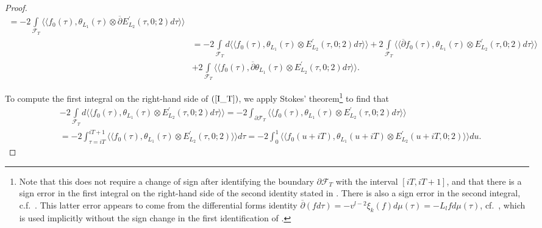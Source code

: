 \documentclass{amsart}
\theoremstyle{definition}
\begin{document}
\begin{proof}
\begin{equation}
\begin{aligned}
= -2 \int\limits_{\mathcal{F}_T} \langle \langle f_0(\tau), \theta_{L_1}(\tau) \otimes \overline{\partial} E_{L_2}^{\prime}(\tau, 0; 2) d \tau \rangle \rangle \\
&=  -2 \int\limits_{\mathcal{F}_T} d \langle \langle f_0(\tau), \theta_{L_1}(\tau) \otimes E_{L_2}^{\prime}(\tau, 0; 2) d \tau \rangle \rangle
+ 2 \int\limits_{\mathcal{F}_T} \langle \langle \overline{\partial} f_0(\tau), \theta_{L_1}(\tau) \otimes E_{L_2}^{\prime}(\tau, 0; 2) d \tau \rangle \rangle \\
&+ 2 \int\limits_{\mathcal{F}_T} \langle \langle  f_0(\tau),  \overline{\partial} \theta_{L_1}(\tau) \otimes E_{L_2}^{\prime}(\tau, 0; 2) d \tau \rangle \rangle. \end{aligned}\end{equation} 

To compute the first integral on the right-hand side of $(\ref{I_T})$, 
we apply Stokes' theorem\footnote{Note that this does not require a change
of sign after identifying the boundary $\partial \mathcal{F}_T$ with the interval $[iT, iT+1]$, 
and that there is a sign error in the first integral on the right-hand side of the second identity stated in \cite[p.~655, proof of Theorem 4.7]{BY}. 
There is also a sign error in the second integral, c.f.~\cite[Theorem 5.7.1]{AGHMP}.
This latter error appears to come from the differential forms identity 
$\overline{\partial}(f d \tau) = -v^{l-2} \xi_k(f) d \mu(\tau) = -L_l f d \mu(\tau)$, cf.~\cite[Lemma 2.5]{Eh},
which is used implicitly without the sign change in the first identification of \cite[p.~655]{BY}.} to find that 
\begin{equation}\begin{aligned}\label{I_T1} 
&-2 \int\limits_{\mathcal{F}_T} d \langle \langle f_0(\tau), \theta_{L_1}(\tau) \otimes E^{\prime}_{L_2}(\tau, 0; 2) d \tau \rangle \rangle 
= -2 \int_{\partial \mathcal{F}_T} \langle \langle f_0(\tau), \theta_{L_1}(\tau) \otimes E_{L_2}^{\prime}(\tau, 0; 2) d \tau \rangle \rangle \\
&= - 2 \int_{\tau = i T}^{iT +1} \langle \langle f_0(\tau), \theta_{L_1}(\tau) \otimes E^{\prime}_{L_2}(\tau, 0; 2) \rangle \rangle d \tau
= - 2 \int_{0}^1  \langle \langle f_0(u + iT), \theta_{L_1}(u + iT) \otimes E^{\prime}_{L_2}(u + iT, 0; 2) \rangle \rangle d u. \end{aligned}\end{equation}


\end{proof}
\end{document}
